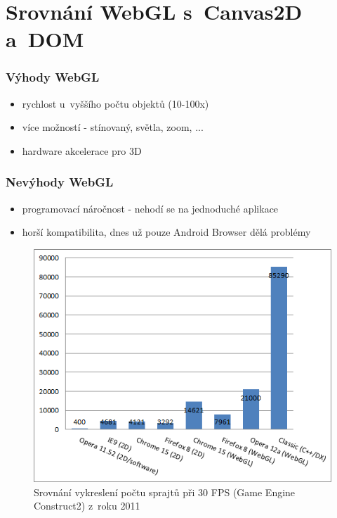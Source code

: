 \documentclass[12pt,a4paper,titlepage,final]{report}
\begin{document}
\section{Srovnání WebGL s~Canvas2D a~DOM}

\subsubsection{Výhody WebGL}
\begin{itemize}
	\item rychlost u~vyššího počtu objektů (10-100x)
	\item více možností - stínovaný, světla, zoom, ...	
	\item hardware akcelerace pro 3D
\end{itemize}
\subsubsection{Nevýhody WebGL}
\begin{itemize}
	\item programovací náročnost - nehodí se na jednoduché aplikace
	\item horší kompatibilita, dnes už pouze Android Browser dělá problémy
\end{itemize}



\begin{figure}[ht]
\begin{center}

\includegraphics[width=12cm]{images/allperf-graph.png}
\caption{Srovnání vykreslení počtu sprajtů při 30 FPS (Game Engine Construct2) z~roku 2011}
\label{fig:theory}
\end{center}
\end{figure}
\end{document}

